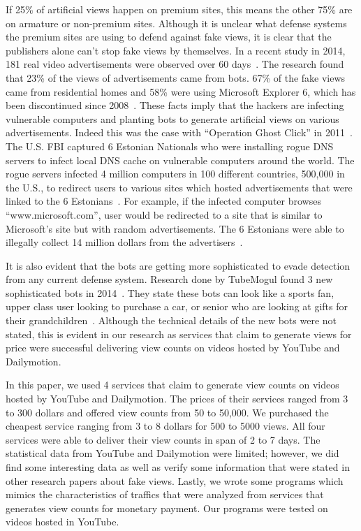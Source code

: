 \documentclass[conference]{IEEEtran}
\begin{document}
If 25\% of artificial views happen on premium sites, this means the other 75\% are on armature or non-premium sites. Although it is unclear what defense systems the premium sites are using to defend against fake views, it is clear that the publishers alone can’t stop fake views by themselves. In a recent study in 2014, 181 real video advertisements were observed over 60 days~\cite{c19}. The research found that 23\% of the views of advertisements came from bots. 67\% of the fake views came from residential homes and 58\% were using Microsoft Explorer 6, which has been discontinued since 2008~\cite{c19}. These facts imply that the hackers are infecting vulnerable computers and planting bots to generate artificial views on various advertisements. Indeed this was the case with “Operation Ghost Click” in 2011~\cite{c3, c4}. The U.S. FBI captured 6 Estonian Nationals who were installing rogue DNS servers to infect local DNS cache on vulnerable computers around the world. The rogue servers infected 4 million computers in 100 different countries, 500,000 in the U.S., to redirect users to various sites which hosted advertisements that were linked to the 6 Estonians~\cite{c4}. For example, if the infected computer browses “www.microsoft.com”, user would be redirected to a site that is similar to Microsoft’s site but with random advertisements. The 6 Estonians were able to illegally collect 14 million dollars from the advertisers~\cite{c4}.

It is also evident that the bots are getting more sophisticated to evade detection from any current defense system. Research done by TubeMogul found 3 new sophisticated bots in 2014~\cite{c2}. They state these bots can look like a sports fan, upper class user looking to purchase a car, or senior who are looking at gifts for their grandchildren~\cite{c2}. Although the technical details of the new bots were not stated, this is evident in our research as services that claim to generate views for price were successful delivering view counts on videos hosted by YouTube and Dailymotion.

In this paper, we used 4 services that claim to generate view counts on videos hosted by YouTube and Dailymotion. The prices of their services ranged from 3 to 300 dollars and offered view counts from 50 to 50,000. We purchased the cheapest service ranging from 3 to 8 dollars for 500 to 5000 views. All four services were able to deliver their view counts in span of 2 to 7 days. The statistical data from YouTube and Dailymotion were limited; however, we did find some interesting data as well as verify some information that were stated in other research papers about fake views. Lastly, we wrote some programs which mimics the characteristics of traffics that were analyzed from services that generates view counts for monetary payment. Our programs were tested on videos hosted in YouTube.
\end{document}
